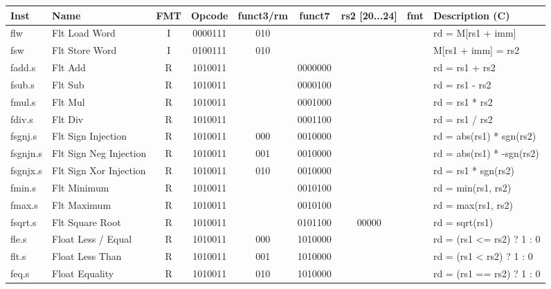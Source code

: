 \begin{center}
\begin{tabular}
{T | l | c | c | c | c | c | c | T } \hline
\rm Inst  & Name                  & FMT   & \rm Opcode & \rm funct3/rm & \rm funct7 & \rm rs2 [20...24] & \rm fmt & \rm Description (C)         \\ \hline
flw       & Flt Load Word         & I     & 0000111    & 010    &        &        & & rd = M[rs1 + imm]    \\
fsw       & Flt Store Word        & I     & 0100111    & 010    &        &        & & M[rs1 + imm] = rs2   \\
\hline
fadd.s    & Flt Add               & R     & 1010011    &        & 0000000 &        & & rd = rs1 + rs2       \\
fsub.s    & Flt Sub               & R     & 1010011    &        & 0000100 &        & & rd = rs1 - rs2       \\
fmul.s    & Flt Mul               & R     & 1010011    &        & 0001000 &        & & rd = rs1 * rs2       \\
fdiv.s    & Flt Div               & R     & 1010011    &        & 0001100 &        & & rd = rs1 / rs2       \\
fsgnj.s   & Flt Sign Injection    & R     & 1010011    & 000    & 0010000 &        & & rd = abs(rs1) * sgn(rs2) \\
fsgnjn.s  & Flt Sign Neg Injection& R     & 1010011    & 001    & 0010000 &        & & rd = abs(rs1) * -sgn(rs2) \\
fsgnjx.s  & Flt Sign Xor Injection& R     & 1010011    & 010    & 0010000 &        & & rd = rs1 * sgn(rs2)  \\
fmin.s    & Flt Minimum           & R     & 1010011    &        & 0010100 &        & & rd = min(rs1, rs2)   \\
fmax.s    & Flt Maximum           & R     & 1010011    &        & 0010100 &        & & rd = max(rs1, rs2)   \\
fsqrt.s   & Flt Square Root       & R     & 1010011    &        & 0101100 & 00000  & & rd = sqrt(rs1)       \\
\hline
fle.s     & Float Less / Equal    & R     & 1010011    & 000    & 1010000 &        & & rd = (rs1 <= rs2) ? 1 : 0\\
flt.s     & Float Less Than       & R     & 1010011    & 001    & 1010000 &        & & rd = (rs1 <  rs2) ? 1 : 0 \\
feq.s     & Float Equality        & R     & 1010011    & 010    & 1010000 &        & & rd = (rs1 == rs2) ? 1 : 0 \\
\hline

\end{tabular}
\end{center}
